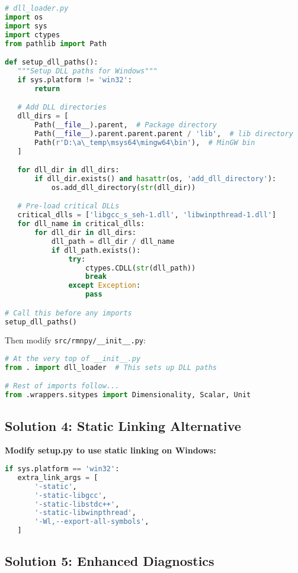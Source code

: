 \documentclass[11pt]{article}
\begin{document}
\begin{lstlisting}[language=python]
# dll_loader.py
import os
import sys
import ctypes
from pathlib import Path

def setup_dll_paths():
   """Setup DLL paths for Windows"""
   if sys.platform != 'win32':
       return

   # Add DLL directories
   dll_dirs = [
       Path(__file__).parent,  # Package directory
       Path(__file__).parent.parent.parent / 'lib',  # lib directory
       Path(r'D:\a\_temp\msys64\mingw64\bin'),  # MinGW bin
   ]

   for dll_dir in dll_dirs:
       if dll_dir.exists() and hasattr(os, 'add_dll_directory'):
           os.add_dll_directory(str(dll_dir))

   # Pre-load critical DLLs
   critical_dlls = ['libgcc_s_seh-1.dll', 'libwinpthread-1.dll']
   for dll_name in critical_dlls:
       for dll_dir in dll_dirs:
           dll_path = dll_dir / dll_name
           if dll_path.exists():
               try:
                   ctypes.CDLL(str(dll_path))
                   break
               except Exception:
                   pass

# Call this before any imports
setup_dll_paths()
\end{lstlisting}

Then modify \texttt{src/rmnpy/\_\_init\_\_.py}:

\begin{lstlisting}[language=python]
# At the very top of __init__.py
from . import dll_loader  # This sets up DLL paths

# Rest of imports follow...
from .wrappers.sitypes import Dimensionality, Scalar, Unit
\end{lstlisting}

\subsection{Solution 4: Static Linking Alternative}

\textbf{Modify setup.py to use static linking on Windows:}

\begin{lstlisting}[language=python]
if sys.platform == 'win32':
   extra_link_args = [
       '-static',
       '-static-libgcc',
       '-static-libstdc++',
       '-static-libwinpthread',
       '-Wl,--export-all-symbols',
   ]
\end{lstlisting}

\subsection{Solution 5: Enhanced Diagnostics}
\end{document}
